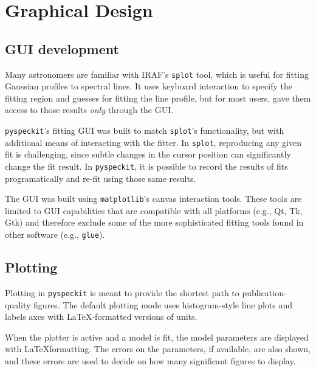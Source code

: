 \documentclass[twocolumn]{aastex61}
\newcommand{\pyspeckit}{\texttt{pyspeckit}\xspace}
\begin{document}


\section{Graphical Design}
\label{sec:gui}
\subsection{GUI development}
Many astronomers are familiar with IRAF's \texttt{splot} tool, which is useful
for fitting Gaussian profiles to spectral lines.  It uses keyboard interaction
to specify the fitting region and guesses for fitting the line profile, but for
most users, gave them access to those results \emph{only} through the GUI.

\texttt{pyspeckit}'s fitting GUI was built to match \texttt{splot}'s
functionality, but with additional means of interacting with the fitter.  In
\texttt{splot}, reproducing any given fit is challenging, since subtle changes
in the cursor position can significantly change the fit result.  In \pyspeckit,
it is possible to record the results of fits programatically and re-fit using
those same results.

The GUI was built using \texttt{matplotlib}'s canvas interaction tools.  These
tools are limited to GUI capabilities that are compatible with all platforms
(e.g., Qt, Tk, Gtk) and therefore exclude some of the more sophisticated fitting
tools found in other software (e.g., \texttt{glue}).

\subsection{Plotting}
Plotting in \pyspeckit is meant to provide the shortest path to
publication-quality figures.  The default plotting mode uses histogram-style
line plots and labels axes with \LaTeX-formatted versions of units.

When the plotter is active and a model is fit, the model parameters are
displayed with \LaTeX formatting.  The errors on the parameters, if available,
are also shown, and these errors are used to decide on how many significant
figures to display.
\end{document}
